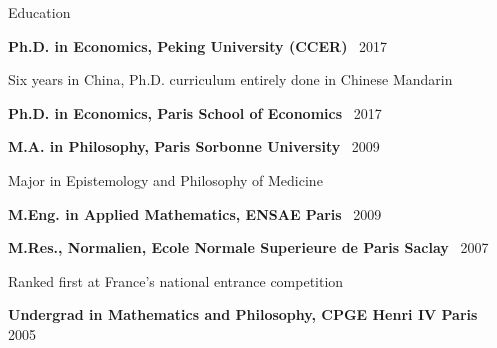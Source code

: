 \documentclass[usegeometry, 10pt, a4paper]{cv} %
\newcommand{\activite}[1]{\textbf{#1}\ }
\newenvironment{normal-itemize}{
\begin{itemize}
     \setlength{\itemsep}{1.3mm}
     \setlength{\parskip}{0pt}
     \setlength{\parsep}{0pt}}
{\end{itemize}
}
\begin{document}
\begin{rubriquetableau}[0.95\textwidth]{Education}\\
\vspace{-0.8cm}

\activite{Ph.D. in Economics, Peking University (CCER)} \hfill 2017\\
\vspace{-0.4cm}
\renewcommand\labelitemi{}
\begin{normal-itemize}
\small
\vspace{-0.5cm}
\item Six years in China, Ph.D. curriculum entirely done in Chinese Mandarin
\end{normal-itemize}
\vspace{0.1cm}

\activite{Ph.D. in Economics, Paris School of Economics} \hfill 2017\\
\vspace{0.1cm}

\activite{M.A. in Philosophy, Paris Sorbonne University} \hfill 2009\\
\vspace{-0.2cm}
\renewcommand\labelitemi{}
\begin{normal-itemize}
\small
\vspace{-0.3cm}
\item Major in Epistemology and Philosophy of Medicine
\end{normal-itemize}
\vspace{0.1cm}

\activite{M.Eng. in Applied Mathematics, ENSAE Paris} \hfill 2009\\
\vspace{0.1cm}

\activite{M.Res., Normalien, Ecole Normale Superieure de Paris Saclay} \hfill 2007\\
\vspace{-0.2cm}
\renewcommand\labelitemi{}
\begin{normal-itemize}
\small
\vspace{-0.3cm}
\item Ranked first at France's national entrance competition 
\end{normal-itemize}
\vspace{0.1cm}

\activite{Undergrad in Mathematics and Philosophy, CPGE Henri IV Paris} \hfill 2005\\

\normalsize
\end{rubriquetableau}
\end{document}
